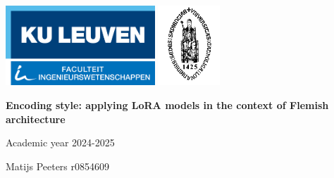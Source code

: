 \thispagestyle{empty}

\includegraphics[height=3cm]{Images/1 Logo FirW CMYK_LOGO.png}
\hspace{6cm}
\includegraphics[height=3cm]{Images/logo_university.png}


\vspace{5cm}
\begin{center}
    \Huge{\rm{ \textbf{Encoding style: applying LoRA models in the context of Flemish architecture}}}\\
    \vspace{0.5cm}
    \Large
\end{center}
\begin{center}
    \Large{Academic year 2024-2025}
\end{center}
\vspace{0,5cm}



\vspace{7,5cm}
\begin{flushright}
    \large{Matijs Peeters r0854609}
    
\end{flushright}